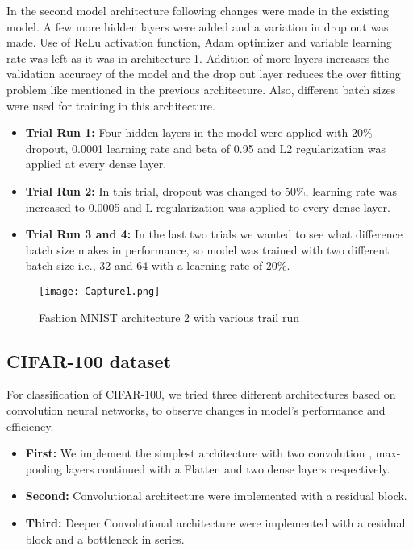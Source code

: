 \documentclass{article}
\begin{document}
In the second model architecture following changes were made in the existing model. A few more hidden layers were added and a variation in drop out was made. Use of ReLu activation function, Adam optimizer and variable learning rate was left as it was in architecture 1. Addition of more layers increases the validation accuracy of the model and the drop out layer reduces the over fitting problem like mentioned in the previous architecture. Also, different batch sizes were used for training in this architecture.

\begin{itemize}
    \item \textbf{Trial Run 1:} Four hidden layers in the model were applied with 20\% dropout, 0.0001 learning rate and beta of 0.95 and L2 regularization was applied at every dense layer. 
    \item \textbf{Trial Run 2:} In this trial, dropout was changed to 50\%, learning rate was increased to 0.0005 and L regularization was applied to every dense layer.
    \item \textbf{Trial Run 3 and 4:} In the last two trials we wanted to see what difference batch size makes in performance, so model was trained with two different batch size i.e., 32 and 64 with a learning rate of 20\%.
\end{itemize}

\begin{figure}[H]
    \centering
    \texttt{[image: Capture1.png]}
    \caption{Fashion MNIST architecture 2 with various trail run}
    \label{fig:MNISTAc2}
\end{figure}

\subsection{CIFAR-100 dataset}

For classification of CIFAR-100, we tried three different architectures based on convolution neural networks, to observe changes in model's performance and efficiency.

\begin{itemize}
    \item \textbf{First:} We implement the simplest architecture with two convolution , max-pooling layers continued with a Flatten and two dense layers respectively.
    \item \textbf{Second:} Convolutional architecture were implemented with a residual block.
    \item \textbf{Third:} Deeper Convolutional architecture were implemented with a residual block and a bottleneck in series. 
\end{itemize}
\end{document}
